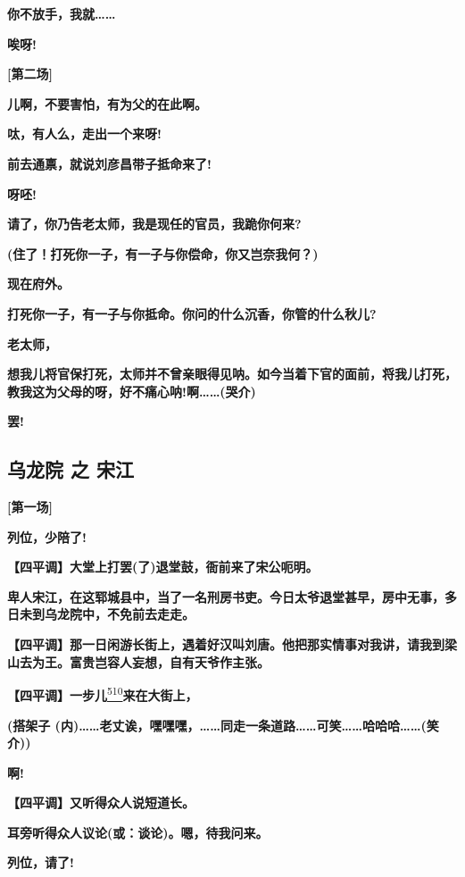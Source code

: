 \textbf{你不放手，我就\ldots{}\ldots{}}

\textbf{唉呀!}

\textbf{{[}第二场{]}}

\textbf{儿啊，不要害怕，有为父的在此啊。}

\textbf{呔，有人么，走出一个来呀!}

\textbf{前去通禀，就说刘彦昌带子抵命来了!}

\textbf{呀呸!}

\textbf{请了，你乃告老太师，我是现任的官员，我跪你何来?}

\textbf{(住了！打死你一子，有一子与你偿命，你又岂奈我何？)}

\textbf{现在府外。}

\textbf{打死你一子，有一子与你抵命。你问的什么沉香，你管的什么秋儿?}

\textbf{老太师，}

\textbf{想我儿将官保打死，太师并不曾亲眼得见呐。如今当着下官的面前，将我儿打死，教我这为父母的呀，好不痛心呐!啊\ldots{}\ldots{}(哭介)}

\textbf{罢!}

\hypertarget{ux4e4cux9f99ux9662-ux4e4b-ux5b8bux6c5f}{%
\subsection{乌龙院 之
宋江}\label{ux4e4cux9f99ux9662-ux4e4b-ux5b8bux6c5f}}

\textbf{{[}第一场{]}}

\textbf{列位，少陪了!}

\textbf{【四平调】大堂上打罢(了)退堂鼓，衙前来了宋公呃明。}

\textbf{卑人宋江，在这郓城县中，当了一名刑房书吏。今日太爷退堂甚早，房中无事，多日未到乌龙院中，不免前去走走。}

\textbf{【四平调】那一日闲游长街上，遇着好汉叫刘唐。他把那实情事对我讲，请我到梁山去为王。富贵岂容人妄想，自有天爷作主张。}

\textbf{【四平调】一步儿}\protect\hyperlink{fn510}{\textsuperscript{510}}\textbf{来在大街上，}

\textbf{(搭架子
(内)\ldots{}\ldots{}老丈诶，嘿嘿嘿，\ldots{}\ldots{}同走一条道路\ldots{}\ldots{}可笑\ldots{}\ldots{}哈哈哈\ldots{}\ldots{}(笑介))}

\textbf{啊!}

\textbf{【四平调】又听得众人说短道长。}

\textbf{耳旁听得众人议论(或：谈论)。嗯，待我问来。}

\textbf{列位，请了!}

